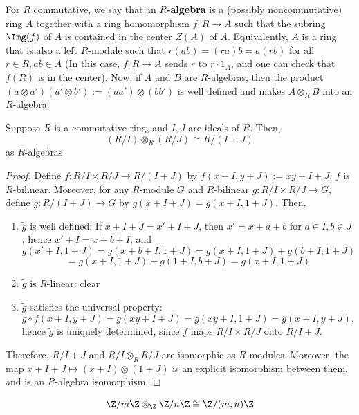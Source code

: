 \begin{defn}
    For $R$ commutative, we say that an \textbf{$R$-algebra} is a (possibly noncommutative) ring $A$ together with a ring homomorphism $f:R \to A$ such that the subring $\Img (f)$ of $A$ is contained in the center $Z(A)$ of $A$. Equivalently, $A$ is a ring that is also a left $R$-module such that $r(ab) = (ra)b=a(rb)$ for all $r \in R, ab \in A$ (In this case, $f:R \to A$ sends $r$ to $r \cdot 1_A$, and one can check that $f(R)$ is in the center). Now, if $A$ and $B$ are $R$-algebras, then the product $(a \otimes a')(a' \otimes b') := (aa') \otimes (bb')$ is well defined and makes $A \otimes _R B$ into an $R$-algebra.
\end{defn}

\begin{prop}
    Suppose $R$ is a commutative ring, and $I,J$ are ideals of $R$. Then,
    $$(R/I) \otimes _R (R/J) \cong R/(I+J)$$
    as $R$-algebras.
\end{prop}

\begin{proof}
    Define $f : R/I \times R/J \to R/(I+J)$ by $f(x+I,y+J):= xy +I+J$. $f$ is $R$-bilinear. Moreover, for any $R$-module $G$ and $R$-bilinear $g : R/I \times R/J \to G$, define $\tilde g : R/(I+J) \to G$ by $\tilde g(x+I+J) = g(x+I,1+J)$. Then,
    \begin{enumerate}
        \item $\tilde g$ is well defined: If $x+I+J = x'+I+J$, then $x'=x+a+b$ for $a\in I, b \in J$, hence $x'+I=x+b+I$, and
        $$g(x'+I,1+J)=g(x+b+I,1+J)=g(x+I,1+J)+g(b+I,1+J)$$
        $$=g(x+I,1+J)+g(1+I,b+J)=g(x+I,1+J)$$
        \item $\tilde g$ is $R$-linear: clear
        \item $\tilde g$ satisfies the universal property:
        $$\tilde g \circ f(x+I,y+J) = \tilde g(xy+I+J)=g(xy+I,1+J)=g(x+I,y+J),$$
        hence $\tilde g$ is uniquely determined, since $f$ maps $R/I \times R/J$ onto $R/I+J$.
    \end{enumerate}
    Therefore, $R/I+J$ and $R/I \otimes _R R/J$ are isomorphic as $R$-modules. Moreover, the map $x+I+J \mapsto (x+I) \otimes (1+J)$ is an explicit isomorphism between them, and is an $R$-algebra isomorphism.
\end{proof}

\begin{cor}
    $$\Z/m\Z \otimes _\Z \Z / n\Z \cong \Z/(m,n)\Z$$
\end{cor}

